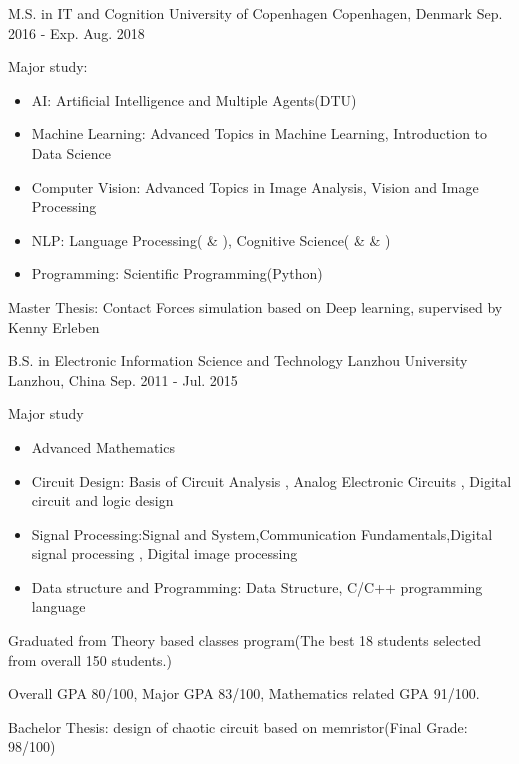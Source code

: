 \begin{cventries}
  \cventry
    {M.S. in IT and Cognition}
    {University of Copenhagen}
    {Copenhagen, Denmark}
    {Sep. 2016 - Exp. Aug. 2018}
    {
      \begin{cvitems}
        \item {
            Major study:
            \begin{itemize}
                \item AI: Artificial Intelligence and Multiple Agents(DTU)
                \item Machine Learning: Advanced Topics in Machine Learning,  Introduction to Data Science
                \item Computer Vision: Advanced Topics in Image Analysis, Vision and Image Processing
                \item NLP: Language Processing(\uppercase\expandafter{} \& \uppercase\expandafter{}), Cognitive Science(\uppercase\expandafter{} \& \uppercase\expandafter{} \& \uppercase\expandafter{})
                \item Programming: Scientific Programming(Python)
            \end{itemize}
        }
        \item {Master Thesis: Contact Forces simulation based on Deep learning, supervised by Kenny Erleben}
      \end{cvitems}
    }
    \cventry
    {B.S. in Electronic Information Science and Technology}
    {Lanzhou University}
    {Lanzhou, China}
    {Sep. 2011 - Jul. 2015}
    {
      \begin{cvitems}
        \item {
            Major study
            \begin{itemize}
                \item Advanced Mathematics
                \item Circuit Design: Basis of Circuit Analysis , Analog Electronic Circuits , Digital
                circuit and logic design
                \item Signal Processing:Signal and System,Communication Fundamentals,Digital
                signal processing , Digital image processing
                \item Data structure and Programming: Data Structure, C/C++ programming language
            \end{itemize}
        }
        \item {Graduated from Theory based classes program(The best 18 students selected from overall 150 students.)}
        \item {Overall GPA 80/100, Major GPA 83/100, Mathematics related GPA 91/100.}
	\item {Bachelor Thesis: design of chaotic circuit based on memristor(Final Grade: 98/100)}
      \end{cvitems}
    }
\end{cventries}

